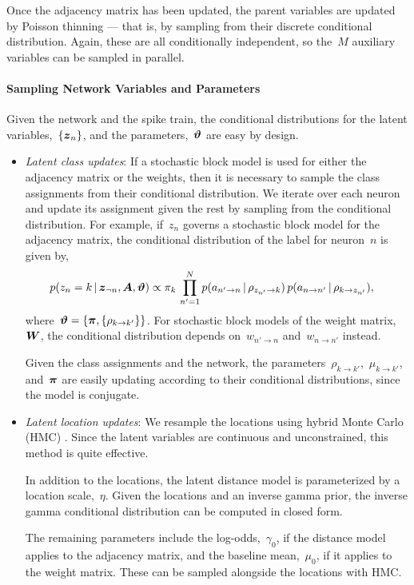 Once the adjacency matrix has been updated, the parent variables
are updated by Poisson thinning --- that is, by sampling from their
discrete conditional distribution. Again, these are all conditionally
independent, so the~$M$ auxiliary variables can be sampled in parallel.

\paragraph{Sampling Network Variables and Parameters}
Given the network and the spike train, the conditional distributions 
for the latent variables,~$\{\boldsymbol{z}_n\}$, and the parameters,~$\boldsymbol{\vartheta}$ 
are easy by design.

\begin{itemize}
  \item \textit{Latent class updates}:
    If a stochastic block model is used for either the adjacency matrix
    or the weights, then it is necessary to sample the class assignments
    from their conditional distribution. We iterate over each neuron and
    update its assignment given the rest by sampling from the conditional
    distribution. For example, if~$z_n$ governs a stochastic block model
    for the adjacency matrix, the conditional distribution of the label
    for neuron~$n$ is given by,
    \begin{align}
      p(z_n = k \,|\, \boldsymbol{z}_{\neg n}, \boldsymbol{A}, \boldsymbol{\vartheta})
      &\propto \pi_{k} \,
      \prod_{n'=1}^N p(a_{n' \to n} \,|\, \rho_{z_{n'} \to k}) \,
                    p(a_{n \to n'} \,|\, \rho_{k \to z_{n'}}),
    \end{align}
    where~$\boldsymbol{\vartheta} = \{\boldsymbol{\pi}, \{\rho_{k \to k'}\} \}$. For stochastic block
    models of the weight matrix,~$\boldsymbol{W}$, the conditional distribution
    depends on~$w_{n' \to n}$ and~$w_{n \to n'}$ instead.

    Given the class assignments and the network, the
    parameters~$\rho_{k \to k'}$,~$\mu_{k \to k'}$, and~$\boldsymbol{\pi}$ are easily updating
    according to their conditional distributions, since the model is
    conjugate.
    
  \item \textit{Latent location updates}:
    We resample the locations using hybrid Monte Carlo (HMC) \citep{Neal10}.
    Since the latent variables are continuous and unconstrained,
    this method is quite effective.

    In addition to the locations, the latent distance model is parameterized
    by a location scale,~$\eta$. Given the locations and an inverse gamma
    prior, the inverse gamma conditional distribution can be computed in
    closed form.
    
    The remaining parameters include the log-odds,~$\gamma_0$, if the
    distance model applies to the adjacency matrix, and the baseline
    mean,~$\mu_0$, if it applies to the weight matrix. These can be
    sampled alongside the locations with HMC.  
\end{itemize}

